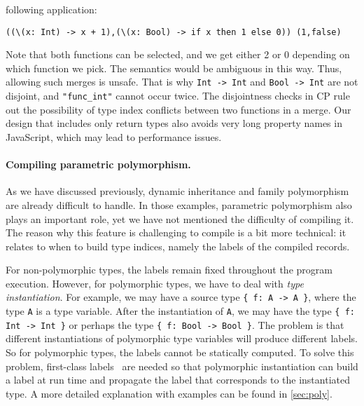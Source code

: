 following application:
\begin{lstlisting}
((\(x: Int) -> x + 1),(\(x: Bool) -> if x then 1 else 0)) (1,false)
\end{lstlisting}
Note that both functions can be selected, and we get either 2 or 0 depending on
which function we pick. The semantics would be ambiguous in this way. Thus,
allowing such merges is unsafe. That is why \lstinline{Int -> Int} and
\lstinline{Bool -> Int} are not disjoint, and \lstinline{"func_int"} cannot
occur twice. The disjointness checks in CP rule out the possibility of type
index conflicts between two functions in a merge. Our design that includes only
return types also avoids very long property names in JavaScript, which may lead
to performance issues.

\paragraph{Compiling parametric polymorphism.}
As we have discussed previously, dynamic inheritance and family polymorphism are
already difficult to handle. In those examples, parametric polymorphism also
plays an important role, yet we have not mentioned the difficulty of compiling
it. The reason why this feature is challenging to compile is a bit more
technical: it relates to when to build type indices, namely the labels of the
compiled records.

For non-polymorphic types, the labels remain fixed throughout the program
execution. However, for polymorphic types, we have to deal with \emph{type
instantiation}. For example, we may have a source type \lstinline|{ f: A -> A }|,
where the type \lstinline|A| is a type variable. After the instantiation of
\lstinline|A|, we may have the type \lstinline|{ f: Int -> Int }| or perhaps
the type \lstinline|{ f: Bool -> Bool }|. The problem is that different
instantiations of polymorphic type variables will produce different labels. So
for polymorphic types, the labels cannot be statically computed. To solve this
problem, first-class labels~\citep{leijen2004first} are needed so that
polymorphic instantiation can build a label at run time and propagate the label
that corresponds to the instantiated type. A more detailed explanation with
examples can be found in \autoref{sec:poly}.

